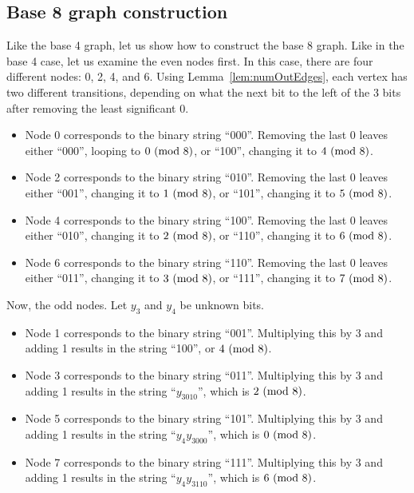 \subsection{Base 8 graph construction} \label{subsubsec:base8proof}
Like the base 4 graph, let us show how to construct the base 8 graph. Like in the base 4 case, let us examine the even nodes first. In this case, there are four different nodes: 0, 2, 4, and 6. Using Lemma~\ref{lem:numOutEdges}, each vertex has two different transitions, depending on what the next bit to the left of the 3 bits after removing the least significant 0. 
\begin{itemize}
    \item Node 0 corresponds to the binary string ``000''. Removing the last 0 leaves either ``000'', looping to $0\ (\mathrm{mod}\ 8)$, or ``100'', changing it to $4\ (\mathrm{mod}\ 8)$.
    \item Node 2 corresponds to the binary string ``010''. Removing the last 0 leaves either ``001'', changing it to $1\ (\mathrm{mod}\ 8)$, or ``101'', changing it to $5\ (\mathrm{mod}\ 8)$.
    \item Node 4 corresponds to the binary string ``100''. Removing the last 0 leaves either ``010'', changing it to $2\ (\mathrm{mod}\ 8)$, or ``110'', changing it to $6\ (\mathrm{mod}\ 8)$.
    \item Node 6 corresponds to the binary string ``110''. Removing the last 0 leaves either ``011'', changing it to $3\ (\mathrm{mod}\ 8)$, or ``111'', changing it to $7\ (\mathrm{mod}\ 8)$.
\end{itemize}
Now, the odd nodes. Let $y_3$ and $y_4$ be unknown bits.
\begin{itemize}
    \item Node 1 corresponds to the binary string ``001''. Multiplying this by 3 and adding 1 results in the string ``100'', or $4\ (\mathrm{mod}\ 8)$.
    \item Node 3 corresponds to the binary string ``011''. Multiplying this by 3 and adding 1 results in the string ``$y_3010$'', which is $2\ (\mathrm{mod}\ 8)$.
    \item Node 5 corresponds to the binary string ``101''. Multiplying this by 3 and adding 1 results in the string ``$y_4y_3000$'', which is $0\ (\mathrm{mod}\ 8)$.
    \item Node 7 corresponds to the binary string ``111''. Multiplying this by 3 and adding 1 results in the string ``$y_4y_3110$'', which is $6\ (\mathrm{mod}\ 8)$.
\end{itemize}
